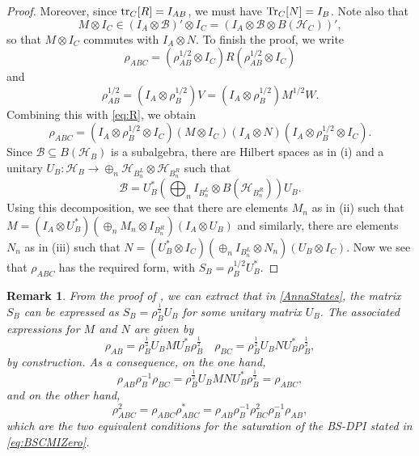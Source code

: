 \documentclass[11pt]{article}
\theoremstyle{newdefinition}
\theoremstyle{newplain}
\newtheorem{remark}[definition]{Remark}
\theoremstyle{myplain}
\DeclareMathOperator{\1}{\mathds{1}}
\begin{document}
{\begin{proof}
Moreover, since $\tr_C[R]=I_{AB}$, we must have
$\Tr_C[N]=I_B$. 
 Note also that 
\[
 M\otimes I_C\in (I_A\otimes \mathcal{B})'\otimes I_C=(I_A\otimes \mathcal{B}\otimes
 B(\mathcal{H}_C))',
\]
so that $M\otimes I_C$ commutes with $I_A\otimes N$. To finish the proof, we write
\[
\rho_{ABC}=(\rho^{1/2}_{AB}\otimes I_C)R(\rho^{1/2}_{AB}\otimes I_C)
\]
and 
\[
\rho_{AB}^{1/2}=(I_A\otimes \rho_B^{1/2})V=(I_A\otimes \rho_B^{1/2})M^{1/2}W.
\]
Combining this with \eqref{eq:R}, we obtain
\[
\rho_{ABC}=(I_A\otimes \rho_B^{1/2}\otimes I_C)(M\otimes I_C)(I_A\otimes N)(I_A\otimes
\rho_B^{1/2}\otimes I_C).
\]
Since $\mathcal {B}\subseteq B(\mathcal{H}_B)$ is a subalgebra, there are Hilbert spaces as in (i) and a
unitary $U_B:\mathcal {H}_B\to \oplus_n \mathcal {H}_{B^L_n}\otimes \mathcal{H}_{B^R_n}$ such that
\[
\mathcal{B}=U^*_B\left(\bigoplus_n I_{B^L_n}\otimes B(\mathcal{H}_{B^R_n})\right) U_B.
\]
Using this decomposition, we see that there are elements $M_n$ as in (ii) such that 
$M=(I_A\otimes U^*_B)(\oplus_n M_n\otimes I_{B^R_n})(I_A\otimes U_B)$ and similarly, there
are elements $N_n$ as in (iii) such that $N=(U_B^*\otimes I_C)(\oplus_n I_{B^L_n}\otimes
N_n)(U_B\otimes I_C)$. Now we see that $\rho_{ABC}$ has the required form, with
$S_B=\rho^{1/2}_BU^*_B$.


\end{proof}

}
\begin{remark} \label{rem:from-decomposition-to-map}
From the proof of 
, we can extract that in \eqref{AnnaStates}, the matrix $S_B$ can be expressed as $S_B=\rho_B^{\frac{1}{2}}U_B$ for some unitary matrix $U_B$. The associated expressions for $M$ and $N$ are given by
\begin{equation}
   \rho_{AB}=\rho_B^{\frac{1}{2}}U_BMU_B^*\rho_B^{\frac{1}{2}} \quad \rho_{BC}=\rho_B^{\frac{1}{2}}U_BNU_B^*\rho_B^{\frac{1}{2}},
\end{equation}
by construction. As a consequence, on the one hand,
\begin{equation}
    \rho_{AB}\rho_{B}^{-1}\rho_{BC}=\rho_B^{\frac{1}{2}}U_BM N U_B^*\rho_B^{\frac{1}{2}}=\rho_{ABC},
\end{equation}
and on the other hand,
\begin{equation}
\rho_{ABC}^2=\rho_{ABC}\rho_{ABC}^*=\rho_{AB}\rho_{B}^{-1}\rho_{BC}^2\rho_B^{-1}\rho_{AB},
\end{equation}
which are the two equivalent conditions for the saturation of the BS-DPI stated in \eqref{eq:BSCMIZero}.
\end{remark}
\end{document}
